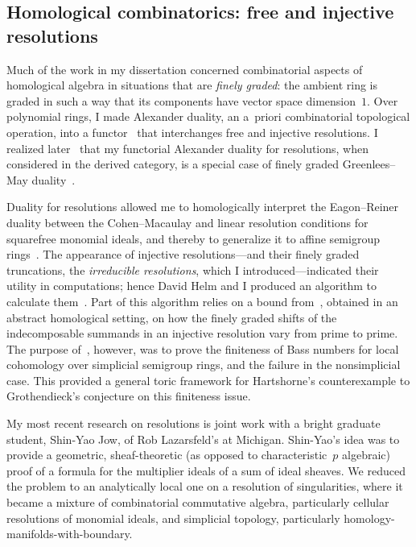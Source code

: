 \documentclass[11pt]{proposal}
\begin{document}
\subsection{Homological combinatorics: free and injective resolutions}


Much of the work in my dissertation \cite{emThesis} concerned
combinatorial aspects of homological algebra in situations that are
\emph{finely graded}: the ambient ring is graded in such a way that
its components have vector space dimension~$1$.  Over polynomial
rings, I made Alexander duality, an a~priori combinatorial topological
operation, into a functor~\cite{alexDual} that interchanges free and
injective resolutions.  I realized later~\cite{gm} that my functorial
Alexander duality for resolutions, when considered in the derived
category, is a special case of finely graded Greenlees--May
duality~\cite{gm92}.

Duality for resolutions allowed me to homologically interpret the
Eagon--Reiner duality \cite{ER98} between the Cohen--Macaulay and
linear resolution conditions for squarefree monomial ideals, and
thereby to generalize it to affine semigroup rings~\cite{cmQuotients}.
The appearance of injective resolutions---and their finely graded
truncations, the \emph{irreducible resolutions}, which I
introduced---indicated their utility in computations; hence David Helm
and I produced an algorithm to calculate them~\cite{injAlg}.  Part of
this algorithm relies on a bound from~\cite{bassNumbers}, obtained in
an abstract homological setting, on how the finely graded shifts of
the indecomposable summands in an injective resolution vary from prime
to prime.  The purpose of~\cite{bassNumbers}, however, was to prove
the finiteness of Bass numbers for local cohomology over simplicial
semigroup rings, and the failure in the nonsimplicial case.  This
provided a general toric framework for Hartshorne's counterexample
\cite{HarCofinite} to Grothendieck's conjecture on this finiteness
issue.

My most recent research on resolutions is joint work
\cite{multIdealSums} with a bright graduate student, Shin-Yao Jow, of
Rob Lazarsfeld's at Michigan.  Shin-Yao's idea was to provide a
geometric, sheaf-theoretic (as opposed to characteristic~$p$
algebraic) proof of a formula for the multiplier ideals of a sum of
ideal sheaves.  We reduced the problem to an analytically local one on
a resolution of singularities, where it became a mixture of
combinatorial commutative algebra, particularly cellular resolutions
of monomial ideals, and simplicial topology, particularly
homology-manifolds-with-boundary.
\end{document}
